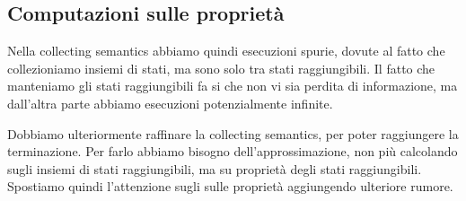 \subsection{Computazioni sulle proprietà}
Nella collecting semantics abbiamo quindi esecuzioni spurie, dovute al fatto che collezioniamo 
insiemi di stati, ma sono solo tra stati raggiungibili. Il fatto che manteniamo gli stati raggiungibili
fa si che non vi sia perdita di informazione, ma dall'altra parte abbiamo esecuzioni potenzialmente infinite.

Dobbiamo ulteriormente raffinare la collecting semantics, per poter raggiungere la terminazione. Per farlo 
abbiamo bisogno dell'approssimazione, non più calcolando sugli insiemi di stati raggiungibili, ma su proprietà 
degli stati raggiungibili. Spostiamo quindi l'attenzione sugli sulle proprietà aggiungendo ulteriore 
rumore.
